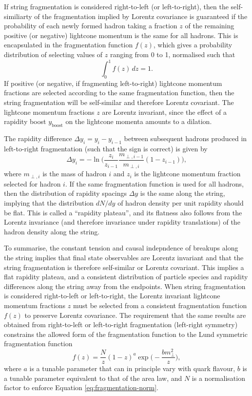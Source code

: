 \documentclass[12pt,a4paper]{report}
\begin{document}
If string fragmentation is considered right-to-left (or left-to-right), then the self-similiarty of the fragmentation implied by Lorentz covariance is guaranteed if the probability of each newly formed hadron taking a fraction $z$ of the remaining positive (or negative) lightcone momentum is the same for all hadrons. This is encapsulated in the fragmentation function $f(z)$, which gives a probability distribution of selecting values of $z$ ranging from 0 to 1, normalised such that
\begin{equation}\label{eq:fragmentation-norm}
  \int_0^1 f(z) \, dz = 1.
\end{equation}
If positive (or negative, if fragmenting left-to-right) lightcone momentum fractions are selected according to the same fragmentation function, then the string fragmentation will be self-similar and therefore Lorentz covariant. The lightcone momentum fractions $z$ are Lorentz invariant, since the effect of a rapidity boost $y_\text{boost}$ on the lightcone momenta amounts to a dilation.

The rapidity difference $\Delta y_i = y_i - y_{i - 1}$ between subsequent hadrons produced in left-to-right fragmentation (such that the sign is correct) is given by
\begin{equation}\label{eq:rapidity-spacing}
  \Delta y_i = -\ln \Bigr( \frac{z_i}{z_{i-1}} \frac{m_{\perp,i-1}}{m_{\perp,i}} (1 - z_{i-1})  \Bigr),
\end{equation}
where $m_{\perp,i}$ is the mass of hadron $i$ and $z_i$ is the lightcone momentum fraction selected for hadron $i$. If the same fragmentation function is used for all hadrons, then the distribution of rapidity spacings $\Delta y$ is the same along the string, implying that the distribution $dN/dy$ of hadron density per unit rapidity should be flat. This is called a ``rapidity plateau'', and its flatness also follows from the Lorentz invariance (and therefore invariance under rapidity translations) of the hadron density along the string.

To summarise, the constant tension and causal indepndence of breakups along the string implies that final state observables are Lorentz invariant and that the string fragmentation is therefore self-similar or Lorentz covariant. This implies a flat rapidity plateau, and a consistent distribution of particle species and rapidity differences along the string away from the endpoints. When string fragmentation is considered right-to-left or left-to-right, the Lorentz invariant lightcone momentum fractions $z$ must be selected from a consistent fragmentation function $f(z)$ to preserve Lorentz covariance. The requirement that the same results are obtained from right-to-left or left-to-right fragmentation (left-right symmetry) constrains the allowed form of the fragmentation function to the Lund symmetric fragmentation function
\begin{equation}\label{eq:lund-fragmentation-function}
  f(z) = \frac{N}{z} (1-z)^a \exp\Bigr( -\frac{b m_\perp^2}{z}\Bigr),
\end{equation}
where $a$ is a tunable parameter that can in principle vary with quark flavour, $b$ is a tunable parameter equivalent to that of the area law, and $N$ is a normalisation factor to enforce Equation \eqref{eq:fragmentation-norm}.
\end{document}
